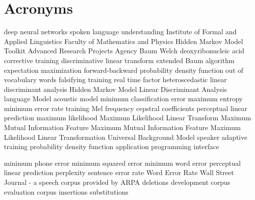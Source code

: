 \chapter{Acronyms}
\label{cha:acronyms}

\begin{acronym}[TDMA]
     {deep neural networks}
     {spoken language understanding}
     {Institute of Formal and Applied Linguistics}
     {Faculty of Mathematics and Physics}
     {Hidden Markov Model Toolkit}
     {Advanced Research Projects Agency}
     {Baum Welch}
     {deoxyribonucleic acid}
     {corrective training}
     {discriminative linear transform}
     {extended Baum algorithm}
     {expectation maximization}
     {forward-backward}
     {probability density function}
     {out of vocabulary words}
     {falsifying training}
     {real time factor}
     {heteroscedastic linear discriminant analysis}
     {Hidden Markov Model}
     {Linear Discriminant Analysis}
     {language Model}
     {acoustic model}
     {minimum classification error}
     {maximum entropy}
     {minimum error rate training}
     {Mel frequency cepstral coefficients}
     {perceptual linear prediction}
     {maximum likelihood}
     {Maximum Likelihood Linear Transform}
     {Maximum Mutual Information}
     {Feature Maximum Mutual Information}
     {Feature Maximum Likelihood Linear Transformation}
     {Universal Background Model}
     {speaker adaptive training}
     {probability density function}
     {application programming interface}

     {minimum phone error}
     {minimum squared error}
     {minimum word error}
     {perceptual linear prediction}
     {perplexity}
     {sentence error rate}
     {Word Error Rate}
     {Wall Street Journal - a speech corpus provided by ARPA}
     {deletions}
     {development corpus}
     {evaluation corpus}
     {insertions}
     {substitutions}
\end{acronym}

